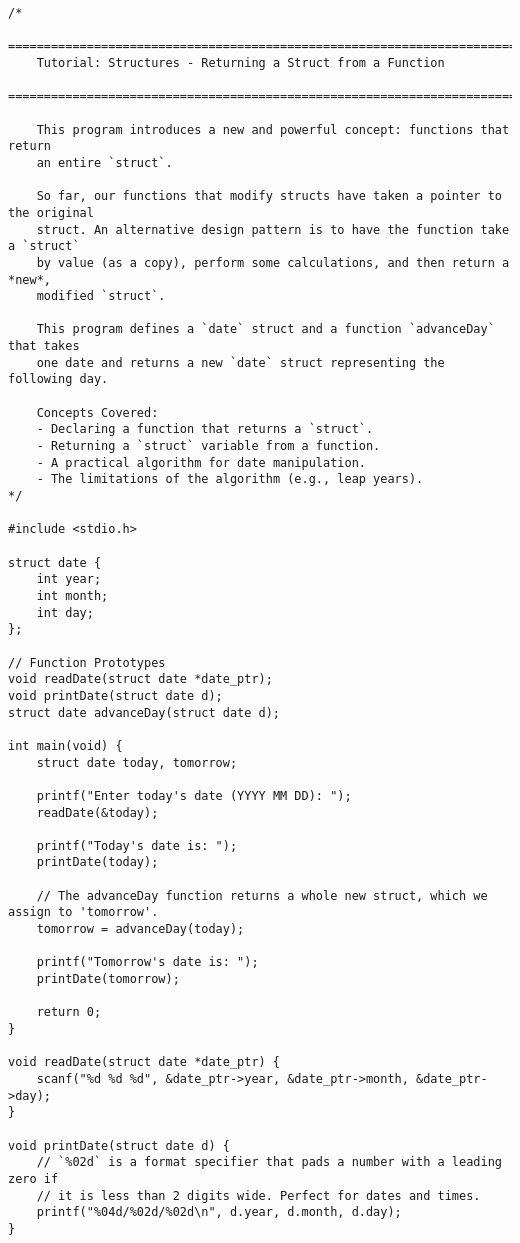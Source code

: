 \documentclass[11pt]{book}
\begin{document}
\begin{verbatim}
/*
    ================================================================================
    Tutorial: Structures - Returning a Struct from a Function
    ================================================================================

    This program introduces a new and powerful concept: functions that return
    an entire `struct`.

    So far, our functions that modify structs have taken a pointer to the original
    struct. An alternative design pattern is to have the function take a `struct`
    by value (as a copy), perform some calculations, and then return a *new*,
    modified `struct`.

    This program defines a `date` struct and a function `advanceDay` that takes
    one date and returns a new `date` struct representing the following day.

    Concepts Covered:
    - Declaring a function that returns a `struct`.
    - Returning a `struct` variable from a function.
    - A practical algorithm for date manipulation.
    - The limitations of the algorithm (e.g., leap years).
*/

#include <stdio.h>

struct date {
    int year;
    int month;
    int day;
};

// Function Prototypes
void readDate(struct date *date_ptr);
void printDate(struct date d);
struct date advanceDay(struct date d);

int main(void) {
    struct date today, tomorrow;

    printf("Enter today's date (YYYY MM DD): ");
    readDate(&today);

    printf("Today's date is: ");
    printDate(today);

    // The advanceDay function returns a whole new struct, which we assign to 'tomorrow'.
    tomorrow = advanceDay(today);

    printf("Tomorrow's date is: ");
    printDate(tomorrow);

    return 0;
}

void readDate(struct date *date_ptr) {
    scanf("%d %d %d", &date_ptr->year, &date_ptr->month, &date_ptr->day);
}

void printDate(struct date d) {
    // `%02d` is a format specifier that pads a number with a leading zero if
    // it is less than 2 digits wide. Perfect for dates and times.
    printf("%04d/%02d/%02d\n", d.year, d.month, d.day);
}


\end{verbatim}
\end{document}
